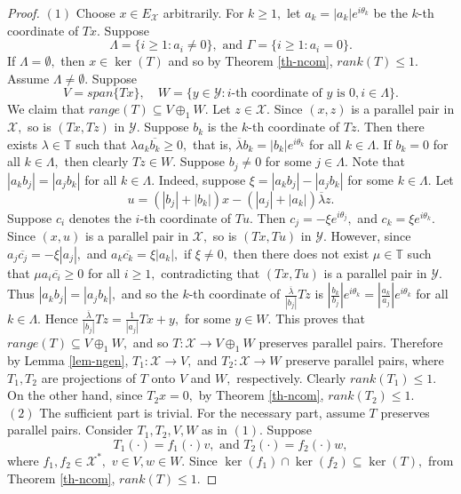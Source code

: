 \documentclass{amsart}
\theoremstyle{definition}
\theoremstyle{remark}
\numberwithin{equation}{section}
\begin{document}
\begin{proof}
 $(1)$ Choose $x\in E_{\mathcal{X}}$ arbitrarily. For $k\geq 1,$ let $a_k=|a_k|e^{i\theta_k}$ be the $k$-th coordinate of $Tx.$ Suppose $$\Lambda=\{i\geq 1: a_i\neq 0 \},\text{ and }\Gamma=\{i\geq 1: a_i= 0 \}.$$ If $\Lambda=\emptyset,$ then $x\in \ker(T)$ and so by Theorem \ref{th-ncom}, $rank(T)\leq 1.$ Assume $\Lambda\neq \emptyset.$ Suppose $$V=span\{Tx\}, \quad W=\{y\in \mathcal{Y}:i\text{-th coordinate of }y \text{ is } 0, i\in \Lambda\}.$$ 
We claim that $range(T)\subseteq V\oplus_1 W.$ Let $z\in \mathcal{X}.$ Since $(x,z)$ is a parallel pair in $\mathcal{X},$ so is $(Tx,Tz)$ in $\mathcal{Y}.$ Suppose $b_k$ is the $k$-th coordinate of $Tz.$ Then there exists $\lambda\in \mathbb{T}$ such that $\lambda a_k\overline{b_k}\geq 0,$  that is, $\overline{\lambda}b_k= |b_k|e^{i\theta_k}$ for all $k\in \Lambda.$ If $b_k=0$ for all $k\in \Lambda,$ then clearly $Tz\in W.$ Suppose $b_j\neq 0$ for some $j\in \Lambda.$ Note that $|a_kb_j|=|a_jb_k|$ for all $k\in \Lambda.$ Indeed, suppose $\xi=|a_kb_j|-|a_jb_k|$ for some $k\in \Lambda.$ Let  
$$u=(|b_j|+|b_k|)x-(|a_j|+|a_k|)\overline{\lambda} z.$$ 
Suppose $c_i$ denotes the $i$-th coordinate of $Tu.$ 
Then  $c_j=-\xi e^{i\theta_j},$ and $c_k=\xi e^{i\theta_k}.$ Since $(x,u)$ is a parallel pair in $\mathcal{X},$ so is $(Tx,Tu)$ in $\mathcal{Y}.$ However, since $a_j\overline{c_j}=-\xi |a_j|,$ and $a_k\overline{c_k}=\xi |a_k|,$ if $\xi\neq 0,$ then there does not exist $\mu\in \mathbb{T}$ such that $\mu a_i\overline{c_i}\geq 0$ for all $i\geq 1,$ contradicting that $(Tx,Tu)$  is a parallel pair in $\mathcal{Y}.$ Thus $|a_kb_j|=|a_jb_k|,$ and so the $k$-th coordinate of $\frac{\overline{\lambda}}{|b_j|}Tz$ is $|\frac{b_k}{b_j}|e^{i\theta_k}=|\frac{a_k}{a_j}|e^{i\theta_k}$ for all $k\in \Lambda.$ Hence $\frac{\overline{\lambda}}{|b_j|}Tz=\frac{1}{|a_j|}Tx+y,$ for some $y\in W.$ This proves that $range(T)\subseteq V\oplus_1 W,$ and so $T:\mathcal{X}\to V\oplus_1 W $ preserves parallel pairs. Therefore by Lemma \ref{lem-ngen}, $T_1:\mathcal{X}\to V,$ and $T_2:\mathcal{X}\to W$ preserve parallel pairs, where $T_1,T_2$ are projections of $T$ onto $V$ and $W,$ respectively. Clearly $rank(T_1)\leq 1.$ On the other hand, since $T_2x=0,$ by Theorem \ref{th-ncom}, $rank(T_2)\leq 1.$\\

$(2)$ The sufficient part is trivial. For the necessary part, assume $T$ preserves parallel pairs. Consider $T_1,T_2, V,W$ as in $(1).$ Suppose $$T_1(\cdot)=f_1(\cdot)v, \text{ and }T_2(\cdot)=f_2(\cdot)w,$$ where $f_1,f_2\in \mathcal{X}^*,$ $v\in V,w\in W.$ Since $\ker(f_1)\cap \ker(f_2)\subseteq \ker(T),$  from Theorem \ref{th-ncom}, $rank(T)\leq 1.$ 
\end{proof}
\end{document}
